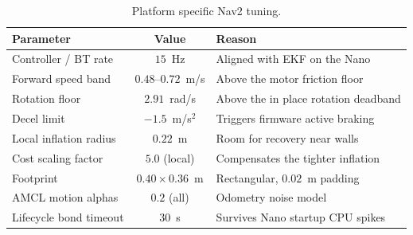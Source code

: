 \documentclass[11pt]{article}
\begin{document}
\begin{table}[H]
\centering
\small
\begin{tabularx}{\linewidth}{|Y|c|Y|}
\hline
\textbf{Parameter} & \textbf{Value} & \textbf{Reason} \\
\hline
Controller / BT rate & $15$~Hz & Aligned with EKF on the Nano \\
\hline
Forward speed band & $0.48$--$0.72$~m/s & Above the motor friction floor \\
\hline
Rotation floor & $2.91$~rad/s & Above the in place rotation deadband \\
\hline
Decel limit & $-1.5$~m/s$^2$ & Triggers firmware active braking \\
\hline
Local inflation radius & $0.22$~m & Room for recovery near walls \\
\hline
Cost scaling factor & $5.0$ (local) & Compensates the tighter inflation \\
\hline
Footprint & $0.40 \times 0.36$~m & Rectangular, $0.02$~m padding \\
\hline
AMCL motion alphas & $0.2$ (all) & Odometry noise model \\
\hline
Lifecycle bond timeout & $30$~s & Survives Nano startup CPU spikes \\
\hline
\end{tabularx}
\caption{Platform specific Nav2 tuning.}\label{tab:nav2}
\end{table}
\end{document}
